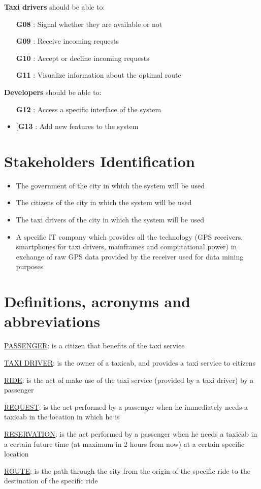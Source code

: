 \noindent \textbf{Taxi drivers} should be able to:
\begin{itemize}
	\item [\textbf{G08}] : Signal whether they are available or not
	\item [\textbf{G09}] : Receive incoming requests
	\item [\textbf{G10}] : Accept or decline incoming requests
	\item [\textbf{G11}] : Visualize information about the optimal route
\end{itemize}

\noindent \textbf{Developers} should be able to:
\begin{itemize}
	\item [\textbf{G12}] : Access a specific interface of the system 
	\item [\textbf{G13} : Add new features to the system
\end{itemize}

\section{Stakeholders Identification}
\begin{itemize}
	\item The government of the city in which the system will be used
	\item The citizens of the city in which the system will be used
	\item The taxi drivers of the city in which the system will be used
	\item A specific IT company which provides all the technology (GPS receivers, smartphones for taxi drivers, mainframes and computational power) in exchange of raw GPS data provided by the receiver used for data mining purposes
\end{itemize}

\section{Definitions, acronyms and abbreviations}
\begin{description}
	\item \underline{PASSENGER}: is a citizen that benefits of the taxi service
	\item \underline{TAXI DRIVER}: is the owner of a taxicab, and provides a taxi service to citizens
	\item \underline{RIDE}: is the act of make use of the taxi service (provided by a taxi driver) by a passenger
	\item \underline{REQUEST}: is the act performed by a passenger when he immediately needs a taxicab in the location in which he is 
	\item \underline{RESERVATION}: is the act performed by a passenger when he needs a taxicab in a certain future time (at maximum in 2 hours from now) at a certain specific location
	\item \underline{ROUTE}: is the path through the city from the origin of the specific ride to the destination of the specific ride
\end{description}

